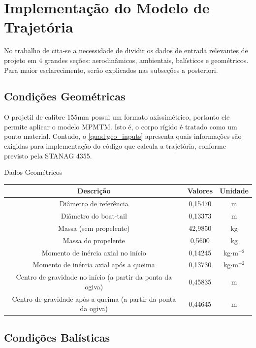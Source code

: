 \section{Implementação do Modelo de Trajetória}\label{subsec:implementacao-trajetoria}

No trabalho de \citeauthor{Rosendo2020} cita-se a necessidade de dividir os dados de entrada relevantes de projeto em 4 grandes seções: aerodinâmicos, ambientais, balísticos e geométricos. Para maior esclarecimento, serão explicados nas subseções a posteriori.

\subsection{Condições Geométricas}\label{subsec:condicoes-geometricas}

O projetil de calibre 155mm possui um formato axissimétrico, portanto ele permite aplicar o modelo MPMTM. Isto é, o corpo rígido é tratado como um ponto material. Contudo, o \autoref{quad:geo_inputs} apresenta quais informações são exigidas para implementação do código que calcula a trajetória, conforme previsto pela STANAG 4355.

\begin{quadro}[htb]
\caption{\label{quad:geo_inputs}Dados Geométricos}
\begin{tabular}{|c|c|c|}
    \hline
    \textbf{Descrição} & \textbf{Valores} & \textbf{Unidade}\\ \hline
    Diâmetro de referência & 0,15470 & m\\ \hline
    Diâmetro do boat-tail & 0,13373 & m\\ \hline
    Massa (sem propelente) & 42,9850 & kg\\ \hline
    Massa do propelente & 0,5600 & kg\\ \hline
    Momento de inércia axial no início & 0,14245 & kg$\cdot$m$^{-2}$\\ \hline
    Momento de inércia axial após a queima & 0,13730 & kg$\cdot$m$^{-2}$\\\hline
    Centro de gravidade no início (a partir da ponta da ogiva) & 0,45835 & m\\\hline
    Centro de gravidade após a queima (a partir da ponta da ogiva) & 0,44645 & m\\\hline
\end{tabular}
\end{quadro}

\subsection{Condições Balísticas}\label{subsec:condicoes-balisticas}

